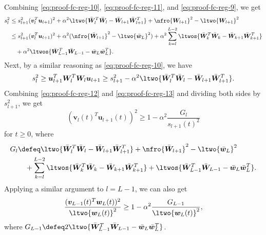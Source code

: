 \documentclass{article} %
\def\vu{{\bm{u}}}
\def\vv{{\bm{v}}}
\def\vw{{\bm{w}}}
\def\mW{{\bm{W}}}
\begin{document}
Combining \eqref{eq:proof-fc-reg-10}, \eqref{eq:proof-fc-reg-11}, and \eqref{eq:proof-fc-reg-9}, we get
\begin{align}
    s_l^2 
    &\leq s_{l+1}^2(\vv_l^T \vu_{l+1})^2 
    + \alpha^2 \ltwo{\bar \mW_l^T \bar \mW_l -  \bar \mW_{l+1} \bar \mW_{l+1}^T}
    + \nfro{\mW_{l+1}}^2 - \ltwo{\mW_{l+1}}^2\notag\\
    &\leq s_{l+1}^2(\vv_l^T \vu_{l+1})^2
    + \alpha^2 (\nfro{\bar \mW_{l+1}}^2 - \ltwo{\bar \vw_L}^2)
    + \alpha^2 \sum_{k=l}^{L-2} \ltwos{\bar \mW_{k}^T \bar \mW_{k}- \bar \mW_{k+1} \bar \mW_{k+1}^T}\notag\\
    &
    \quad+ \alpha^2 \ltwos{\bar \mW_{L-1}^T \bar \mW_{L-1}- \bar \vw_{L} \bar \vw_{L}^T}.
    \label{eq:proof-fc-reg-12}
\end{align}
Next, by a similar reasoning as \eqref{eq:proof-fc-reg-10}, we have
\begin{align}
    s_l^2 \geq \vu_{l+1}^T \mW_{l}^T \mW_{l} \vu_{l+1} \geq s_{l+1}^2 - \alpha^2 \ltwo{\bar \mW_l^T \bar \mW_l -  \bar \mW_{l+1} \bar \mW_{l+1}^T}.\label{eq:proof-fc-reg-13}
\end{align}
Combining \eqref{eq:proof-fc-reg-12} and \eqref{eq:proof-fc-reg-13} and dividing both sides by $s_{l+1}^2$, we get
\begin{equation}
\label{eq:proof-fc-reg-14}
    (\vv_l(t)^T \vu_{l+1}(t))^2 \geq 1 - \alpha^2 
    \frac{G_l}{s_{l+1}(t)^2}
\end{equation}
for $t \geq 0$, where
\begin{align*}
	G_l &\defeq \ltwo{\bar \mW_l^T \bar \mW_l -  \bar \mW_{l+1} \bar \mW_{l+1}^T}
	+ \nfro{\bar \mW_{l+1}}^2 - \ltwo{\bar \vw_L}^2\\
	&\quad + \sum_{k=l}^{L-2} \ltwos{\bar \mW_{k}^T \bar \mW_{k}- \bar \mW_{k+1} \bar \mW_{k+1}^T}
	+\ltwos{\bar \mW_{L-1}^T \bar \mW_{L-1}- \bar \vw_{L} \bar \vw_{L}^T}.
\end{align*}
Applying a similar argument to $l = L-1$, we can also get
\begin{equation}
	\label{eq:proof-fc-reg-15}
	\frac{(\vv_{L-1}(t)^T \vw_L(t))^2}{\ltwo{\vw_L(t)}^2} \geq 1 - \alpha^2 \frac{G_{L-1}}{\ltwo{\vw_L(t)}^2},
\end{equation}
where
$G_{L-1} \defeq 2 \ltwo{\bar \mW_{L-1}^T \bar \mW_{L-1} -  \bar \vw_{L} \bar \vw_{L}^T}$.
\end{document}
